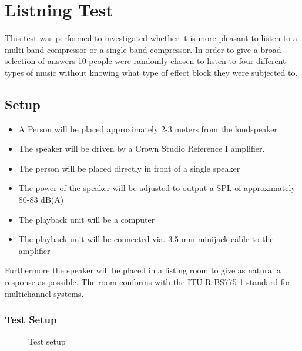 \chapter{Listning Test}\label{app:journal_ListningTest}

This test was performed to investigated whether it is more pleasant to listen to a multi-band compressor or a single-band compressor. In order to give a broad selection of answers 10 people were randomly chosen to listen to four different types of music without knowing what type of effect block they were subjected to.


\section{Setup}



\begin{itemize}
\item A Person will be placed approximately 2-3 meters from the loudspeaker
\item The speaker will be driven by a Crown Studio Reference I amplifier.
\item The person will be placed directly in front of a single speaker
\item The power of the speaker will be adjusted to output a \gls{SPL} of approximately 80-83 dB(A)
\item The playback unit will be a computer
\item The playback unit will be connected via. 3.5 mm minijack cable to the amplifier
\end{itemize}
\vspace{-5mm}
Furthermore the speaker will be placed in a listing room to give as natural a response as possible. The room conforms with the ITU-R BS775-1 standard for multichannel systems.

\subsection*{Test Setup}

\begin{figure}[H]
\centering
{}
\caption{Test setup}
\label{figure:SpeakertestSetupListning}
\end{figure}

